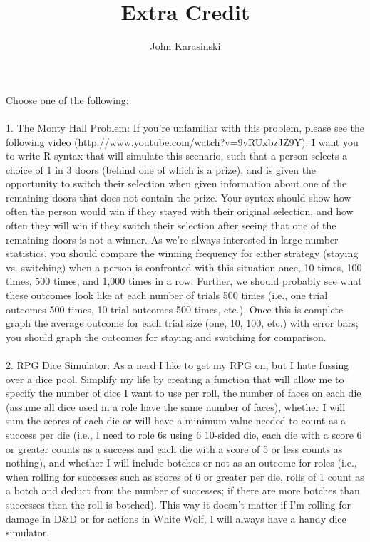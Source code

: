 \documentclass[onecolumn,10pt]{jhwhw}
\author{John Karasinski}
\title{Extra Credit}
\begin{document}
%
%
\noindent Choose one of the following:\\
\\
1. The Monty Hall Problem: If you're unfamiliar with this problem, please see the following video (http://www.youtube.com/watch?v=9vRUxbzJZ9Y).
I want you to write R syntax that will simulate this scenario, such that a person selects a choice of 1 in 3 doors (behind one of which is a prize), and is given the opportunity to switch their selection when given information about one of the remaining doors that does not contain the prize. Your syntax should show how often the person would win if they stayed with their original selection, and how often they will win if they switch their selection after seeing that one of the remaining doors is not a winner. As we're always interested in large number statistics, you should compare the winning frequency for either strategy (staying vs. switching) when a person is confronted with this situation once, 10 times, 100 times, 500 times, and 1,000 times in a row. Further, we should probably see what these outcomes look like at each number of trials 500 times (i.e., one trial outcomes 500 times, 10 trial outcomes 500 times, etc.). Once this is complete graph the average outcome for each trial size (one, 10, 100, etc.) with error bars; you should graph the outcomes for staying and switching for comparison.\\
\\
2. RPG Dice Simulator: As a nerd I like to get my RPG on, but I hate fussing over a dice pool. Simplify my life by creating a function that will allow me to specify the number of dice I want to use per roll, the number of faces on each die (assume all dice used in a role have the same number of faces), whether I will sum the scores of each die or will have a minimum value needed to count as a success per die (i.e., I need to role 6s using 6 10-sided die, each die with a score 6 or greater counts as a success and each die with a score of 5 or less counts as nothing), and whether I will include botches or not as an outcome for roles (i.e., when rolling for successes such as scores of 6 or greater per die, rolls of 1 count as a botch and deduct from the number of successes; if there are more botches than successes then the roll is botched). This way it doesn't matter if I'm rolling for damage in D\&D or for actions in White Wolf, I will always have a handy dice simulator.\\
\end{document}
